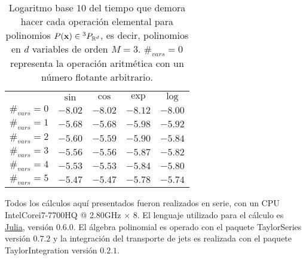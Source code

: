 \begin{table}[h!]
\centering
\begin{tabular}{c|cccc}
\toprule
     & \textbf{$\sin$} & \textbf{$\cos$} & \textbf{$\exp$} & \textbf{$\log$} \\ \cmidrule(l){1-5} 
 $\#_{vars} = 0$ & $-8.02$ & $-8.02$ & $-8.12$ & $-8.00$ \\
 $\#_{vars} = 1$ & $-5.68$ & $-5.68$ & $-5.98$ & $-5.92$ \\
 $\#_{vars} = 2$ & $-5.60$ & $-5.59$ & $-5.90$ & $-5.84$ \\
 $\#_{vars} = 3$ & $-5.56$ & $-5.56$ & $-5.87$ & $-5.82$ \\
 $\#_{vars} = 4$ & $-5.53$ & $-5.53$ & $-5.84$ & $-5.80$ \\
 $\#_{vars} = 5$ & $-5.47$ & $-5.47$ & $-5.78$ & $-5.74$ \\ \bottomrule 
\end{tabular}
\caption{Logaritmo base $10$ del tiempo que demora hacer cada operación elemental para polinomios $P(\mathbf{x}) \in {^{3}P_{\mathbb{R}^ d} }$, es decir, polinomios en $d$ variables de orden $M = 3$. $\#_{vars}=0$ representa la operación aritmética con un número flotante arbitrario.}
\label{table:times_algpoli_2}
\end{table}

Todos los cálculos aquí presentados fueron realizados en serie, con un CPU Intel\textregistered  Core\texttrademark  i7-7700HQ @ 2.80GHz $\times$ 8. El lenguaje utilizado para el cálculo es \href{julialang.org}{\textsf{Julia}}, versión $0.6.0$. El álgebra polinomial es operado con el paquete \textsf{TaylorSeries} \cite{TaylorIntegration} versión $0.7.2$ y la integración del transporte de jets es realizada con el paquete \textsf{TaylorIntegration} \cite{TaylorIntegration} versión $0.2.1$.